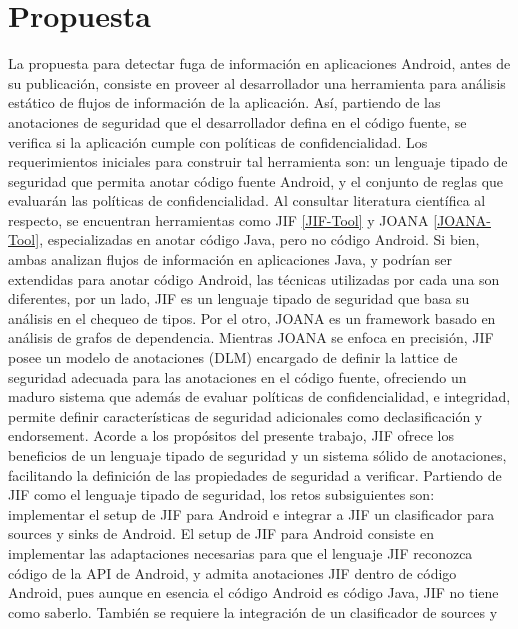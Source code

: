 \section{Propuesta}
\label{sec:propuesta-sol}
La propuesta para detectar fuga de información en aplicaciones Android, antes de
su publicación, consiste en proveer al desarrollador una herramienta para
análisis estático de flujos de información de la aplicación. Así, partiendo de
las anotaciones de seguridad que el desarrollador defina en el código fuente, se
verifica si la aplicación cumple con políticas de confidencialidad.\newline
Los requerimientos iniciales para construir tal herramienta son: un lenguaje
tipado de seguridad que permita anotar código fuente Android, y el conjunto de
reglas que evaluarán las políticas de confidencialidad.\newline 
Al consultar literatura científica al respecto, se encuentran herramientas como
JIF \ref{JIF-Tool} y JOANA \ref{JOANA-Tool}, especializadas en anotar código
Java, pero no código Android.
Si bien, ambas analizan flujos de información en aplicaciones Java, y podrían
ser extendidas para anotar código Android, las técnicas utilizadas por cada una
son diferentes, por un lado, JIF es un lenguaje tipado de seguridad que basa su
análisis en el chequeo de tipos. Por el otro, JOANA es un framework basado en
análisis de grafos de dependencia. Mientras JOANA se enfoca en precisión, JIF
posee un modelo de anotaciones (DLM) encargado de definir la lattice de
seguridad adecuada para las anotaciones en el código fuente, ofreciendo un
maduro sistema que además de evaluar políticas de confidencialidad, e
integridad, permite definir características de seguridad adicionales como
declasificación y endorsement.
Acorde a los propósitos del presente trabajo, JIF ofrece los beneficios de un
lenguaje tipado de seguridad y un sistema  sólido  de anotaciones, facilitando
la definición de las propiedades de seguridad a verificar.\newline 
Partiendo de JIF como el lenguaje tipado de seguridad, los retos subsiguientes
son: implementar el setup de JIF para Android e integrar a JIF un clasificador
para sources y sinks de Android. El setup de JIF para Android consiste en
implementar las adaptaciones necesarias para que el lenguaje JIF reconozca
código de la API de Android, y admita anotaciones JIF dentro de código
Android, pues aunque en esencia el código Android es código Java, JIF no tiene
como saberlo. También se requiere la integración de un clasificador de sources y
